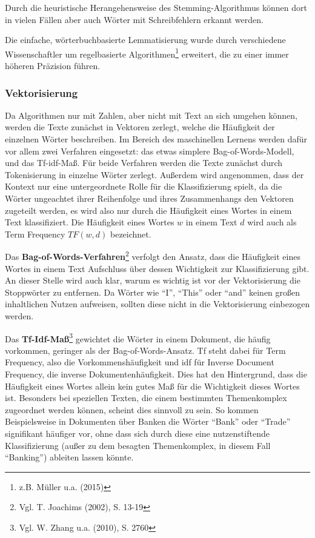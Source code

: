 \documentclass[a4paper,12pt]{article}
\begin{document}
Durch die heuristische Herangehensweise des Stemming-Algorithmus können dort in vielen Fällen aber auch Wörter mit Schreibfehlern erkannt werden. 

Die einfache, wörterbuchbasierte Lemmatisierung wurde durch verschiedene Wissenschaftler um regelbasierte Algorithmen\footnote{z.B. Müller u.a. (2015)} erweitert, die zu einer immer höheren Präzision führen. 


\subsubsection{Vektorisierung}

Da Algorithmen nur mit Zahlen, aber nicht mit Text an sich umgehen können, werden die Texte zunächst in Vektoren zerlegt, welche die Häufigkeit der einzelnen Wörter beschreiben. Im Bereich des maschinellen Lernens werden dafür vor allem zwei Verfahren eingesetzt: das etwas simplere Bag-of-Words-Modell, und das Tf-idf-Maß. Für beide Verfahren werden die Texte zunächst durch Tokenisierung in einzelne Wörter zerlegt. Außerdem wird angenommen, dass der Kontext nur eine untergeordnete Rolle für die Klassifizierung spielt, da die Wörter ungeachtet ihrer Reihenfolge und ihres Zusammenhangs den Vektoren zugeteilt werden, es wird also nur durch die Häufigkeit eines Wortes in einem Text klassifiziert. Die Häufigkeit eines Wortes $w$ in einem Text $d$ wird auch als Term Frequency $TF(w, d)$ bezeichnet. 

Das \textbf{Bag-of-Words-Verfahren}\footnote{Vgl. T. Joachims (2002), S. 13-19}
 verfolgt den Ansatz, dass die Häufigkeit eines Wortes in einem Text Aufschluss über dessen Wichtigkeit zur Klassifizierung gibt. An dieser Stelle wird auch klar, warum es wichtig ist vor der Vektorisierung die Stoppwörter zu entfernen. Da Wörter wie ``I'', ``This'' oder ``and'' keinen großen inhaltlichen Nutzen aufweisen, sollten diese nicht in die Vektorisierung einbezogen werden. 

Das \textbf{Tf-Idf-Maß}\footnote{Vgl. W. Zhang u.a. (2010), S. 2760}
 gewichtet die Wörter in einem Dokument, die häufig vorkommen, geringer als der Bag-of-Words-Ansatz. Tf steht dabei für Term Frequency, also die Vorkommenshäufigkeit und idf für Inverse Document Frequency, die inverse Dokumentenhäufigkeit. Dies hat den Hintergrund, dass die Häufigkeit eines Wortes allein kein gutes Maß für die Wichtigkeit dieses Wortes ist. Besonders bei speziellen Texten, die einem bestimmten Themenkomplex zugeordnet werden können, scheint dies sinnvoll zu sein. So kommen Beispielsweise in Dokumenten über Banken die Wörter ``Bank'' oder ``Trade'' signifikant häufiger vor, ohne dass sich durch diese eine nutzenstiftende Klassifizierung (außer zu dem besagten Themenkomplex, in diesem Fall ``Banking'') ableiten lassen könnte. 
\end{document}

